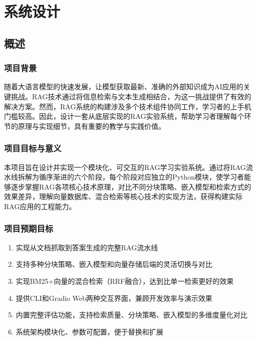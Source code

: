 \documentclass[10pt,a4paper]{article}
\begin{document}
\section{系统设计}

\subsection{概述}

\subsubsection{项目背景}

随着大语言模型的快速发展，让模型获取最新、准确的外部知识成为AI应用的关键挑战。RAG技术通过将信息检索与文本生成相结合，为这一挑战提供了有效的解决方案。然而，RAG系统的构建涉及多个技术组件协同工作，学习者的上手机门槛较高。因此，设计一套从底层实现的RAG实验系统，帮助学习者理解每个环节的原理与实现细节，具有重要的教学与实践价值。

\subsubsection{项目目标与意义}

本项目旨在设计并实现一个模块化、可交互的RAG学习实验系统。通过将RAG流水线拆解为循序渐进的六个阶段，每个阶段对应独立的Python模块，使学习者能够逐步掌握RAG各项核心技术原理，对比不同分块策略、嵌入模型和检索方式的效果差异，理解向量数据库、混合检索等核心技术的实现方法，获得构建实际RAG应用的工程能力。

\subsubsection{项目预期目标}

\begin{enumerate}[label=(\arabic*)]
\item 实现从文档抓取到答案生成的完整RAG流水线
\item 支持多种分块策略、嵌入模型和向量存储后端的灵活切换与对比
\item 实现BM25+向量的混合检索（RRF融合），达到比单一检索更好的效果
\item 提供CLI和Gradio Web两种交互界面，兼顾开发效率与演示效果
\item 内置完整评估功能，支持检索质量、分块策略、嵌入模型的多维度量化对比
\item 系统架构模块化、参数可配置，便于替换和扩展
\end{enumerate}
\end{document}
